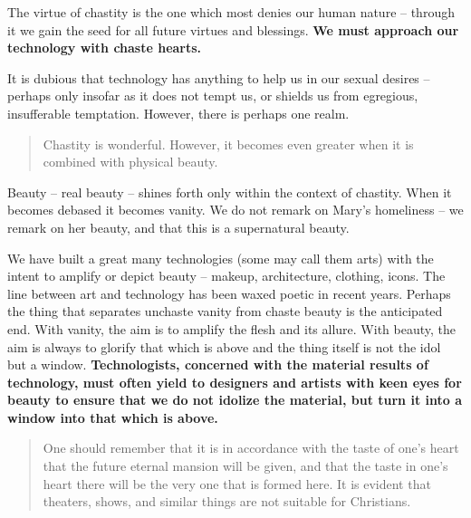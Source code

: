 \documentclass[letterpaper]{article}
\begin{document}
    The virtue of chastity is the one which most denies our human nature -- through it we gain the seed for all future virtues and blessings. \textbf{We must approach our technology with chaste hearts.}



    It is dubious that technology has anything to help us in our sexual desires -- perhaps only insofar as it does not tempt us, or shields us from egregious, insufferable temptation. However, there is perhaps one realm.

    \begin{quote}
      Chastity is wonderful. However, it becomes even greater when it is combined with physical beauty.
    \end{quote}

    Beauty -- real beauty -- shines forth only within the context of chastity. When it becomes debased it becomes vanity. We do not remark on Mary's homeliness -- we remark on her beauty, and that this is a supernatural beauty.

    We have built a great many technologies (some may call them arts) with the intent to amplify or depict beauty -- makeup, architecture, clothing, icons. The line between art and technology has been waxed poetic in recent years. Perhaps the thing that separates unchaste vanity from chaste beauty is the anticipated end. With vanity, the aim is to amplify the flesh and its allure. With beauty, the aim is always to glorify that which is above and the thing itself is not the idol but a window. \textbf{Technologists, concerned with the material results of technology, must often yield to designers and artists with keen eyes for beauty to ensure that we do not idolize the material, but turn it into a window into that which is above.}

    \begin{quote}
      One should remember that it is in accordance with the taste of one's heart that the future eternal mansion will be given, and that the taste in one's heart there will be the very one that is formed here. It is evident that theaters, shows, and similar things are not suitable for Christians.
    \end{quote}
\end{document}
